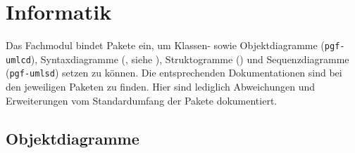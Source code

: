 \section{Informatik}
\label{fach:informatik}
Das Fachmodul  bindet Pakete ein, um Klassen- sowie Objektdiagramme (\texttt{pgf-umlcd}), Syntaxdiagramme (, siehe ), Struktogramme () und Sequenzdiagramme (\texttt{pgf-umlsd}) setzen zu können. Die entsprechenden Dokumentationen sind bei den jeweiligen Paketen zu finden. Hier sind lediglich Abweichungen und Erweiterungen vom Standardumfang der Pakete dokumentiert.

\subsection{Objektdiagramme}

